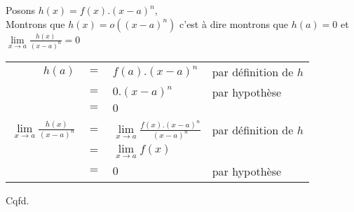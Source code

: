 \documentclass[a4paper,11pt]{report}
\begin{document}
Posons $h(x) = f(x).(x-a)^n$,\\
Montrons que $h(x) = o((x-a)^n)$ c'est à dire montrons que $h(a) = 0$ et $\lim\limits_{x \rightarrow a}{\frac{h(x)}{(x-a)^{n}}} = 0$
\begin{center}
\begin{tabular}{rcll}
$h(a)$ & $=$ & $f(a).(x-a)^n$ & par définition de $h$\\
& $=$ & $0.(x-a)^n$ & par hypothèse \\
& $=$ & $0$ &\\
&&& \\
$\lim\limits_{x \rightarrow a}{\frac{h(x)}{(x-a)^{n}}}$ & $=$ & $\lim\limits_{x \rightarrow a}{\frac{f(x).(x-a)^{n}}{(x-a)^{n}}}$ & par définition de $h$\\
& $=$ & $\lim\limits_{x \rightarrow a}{f(x)}$ & \\
& $=$ & $0$ & par hypothèse\\
\end{tabular}
\end{center}
Cqfd.
\end{document}
